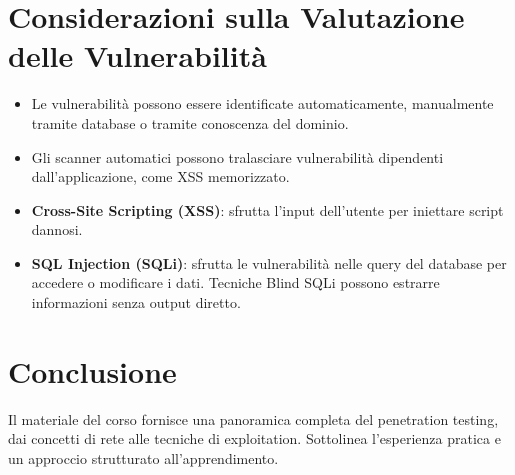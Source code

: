 \documentclass[12pt]{article}
\begin{document}
\section{Considerazioni sulla Valutazione delle Vulnerabilit\`{a}}
\begin{itemize}
    \item Le vulnerabilit\`{a} possono essere identificate automaticamente, 
    manualmente tramite database o tramite conoscenza del dominio.
    \item Gli scanner automatici possono tralasciare vulnerabilit\`{a} dipendenti 
    dall'applicazione, come XSS memorizzato.
    \item \textbf{Cross-Site Scripting (XSS)}: sfrutta l'input dell'utente per 
    iniettare script dannosi.
    \item \textbf{SQL Injection (SQLi)}: sfrutta le vulnerabilit\`{a} nelle query 
    del database per accedere o modificare i dati. Tecniche Blind SQLi possono 
    estrarre informazioni senza output diretto. 
\end{itemize}


\section{Conclusione}
Il materiale del corso fornisce una panoramica completa del penetration testing, 
dai concetti di rete alle tecniche di exploitation. Sottolinea l'esperienza 
pratica e un approccio strutturato all'apprendimento.
\end{document}
